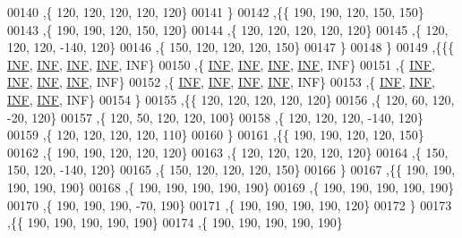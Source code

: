 \begin{DoxyCode}
00140   ,\{   120,   120,   120,   120,   120\}
00141   \}
00142  ,\{\{   190,   190,   120,   150,   150\}
00143   ,\{   190,   190,   120,   150,   120\}
00144   ,\{   120,   120,   120,   120,   120\}
00145   ,\{   120,   120,   120,  -140,   120\}
00146   ,\{   150,   120,   120,   120,   150\}
00147   \}
00148  \}
00149 ,\{\{\{   \hyperlink{constants_8h_a12c2040f25d8e3a7b9e1c2024c618cb6}{INF},   \hyperlink{constants_8h_a12c2040f25d8e3a7b9e1c2024c618cb6}{INF},   \hyperlink{constants_8h_a12c2040f25d8e3a7b9e1c2024c618cb6}{INF},   \hyperlink{constants_8h_a12c2040f25d8e3a7b9e1c2024c618cb6}{INF},   INF\}
00150   ,\{   \hyperlink{constants_8h_a12c2040f25d8e3a7b9e1c2024c618cb6}{INF},   \hyperlink{constants_8h_a12c2040f25d8e3a7b9e1c2024c618cb6}{INF},   \hyperlink{constants_8h_a12c2040f25d8e3a7b9e1c2024c618cb6}{INF},   \hyperlink{constants_8h_a12c2040f25d8e3a7b9e1c2024c618cb6}{INF},   INF\}
00151   ,\{   \hyperlink{constants_8h_a12c2040f25d8e3a7b9e1c2024c618cb6}{INF},   \hyperlink{constants_8h_a12c2040f25d8e3a7b9e1c2024c618cb6}{INF},   \hyperlink{constants_8h_a12c2040f25d8e3a7b9e1c2024c618cb6}{INF},   \hyperlink{constants_8h_a12c2040f25d8e3a7b9e1c2024c618cb6}{INF},   INF\}
00152   ,\{   \hyperlink{constants_8h_a12c2040f25d8e3a7b9e1c2024c618cb6}{INF},   \hyperlink{constants_8h_a12c2040f25d8e3a7b9e1c2024c618cb6}{INF},   \hyperlink{constants_8h_a12c2040f25d8e3a7b9e1c2024c618cb6}{INF},   \hyperlink{constants_8h_a12c2040f25d8e3a7b9e1c2024c618cb6}{INF},   INF\}
00153   ,\{   \hyperlink{constants_8h_a12c2040f25d8e3a7b9e1c2024c618cb6}{INF},   \hyperlink{constants_8h_a12c2040f25d8e3a7b9e1c2024c618cb6}{INF},   \hyperlink{constants_8h_a12c2040f25d8e3a7b9e1c2024c618cb6}{INF},   \hyperlink{constants_8h_a12c2040f25d8e3a7b9e1c2024c618cb6}{INF},   INF\}
00154   \}
00155  ,\{\{   120,   120,   120,   120,   120\}
00156   ,\{   120,    60,   120,   -20,   120\}
00157   ,\{   120,    50,   120,   120,   100\}
00158   ,\{   120,   120,   120,  -140,   120\}
00159   ,\{   120,   120,   120,   120,   110\}
00160   \}
00161  ,\{\{   190,   190,   120,   120,   150\}
00162   ,\{   190,   190,   120,   120,   120\}
00163   ,\{   120,   120,   120,   120,   120\}
00164   ,\{   150,   150,   120,  -140,   120\}
00165   ,\{   150,   120,   120,   120,   150\}
00166   \}
00167  ,\{\{   190,   190,   190,   190,   190\}
00168   ,\{   190,   190,   190,   190,   190\}
00169   ,\{   190,   190,   190,   190,   190\}
00170   ,\{   190,   190,   190,   -70,   190\}
00171   ,\{   190,   190,   190,   190,   120\}
00172   \}
00173  ,\{\{   190,   190,   190,   190,   190\}
00174   ,\{   190,   190,   190,   190,   190\}

\end{DoxyCode}
